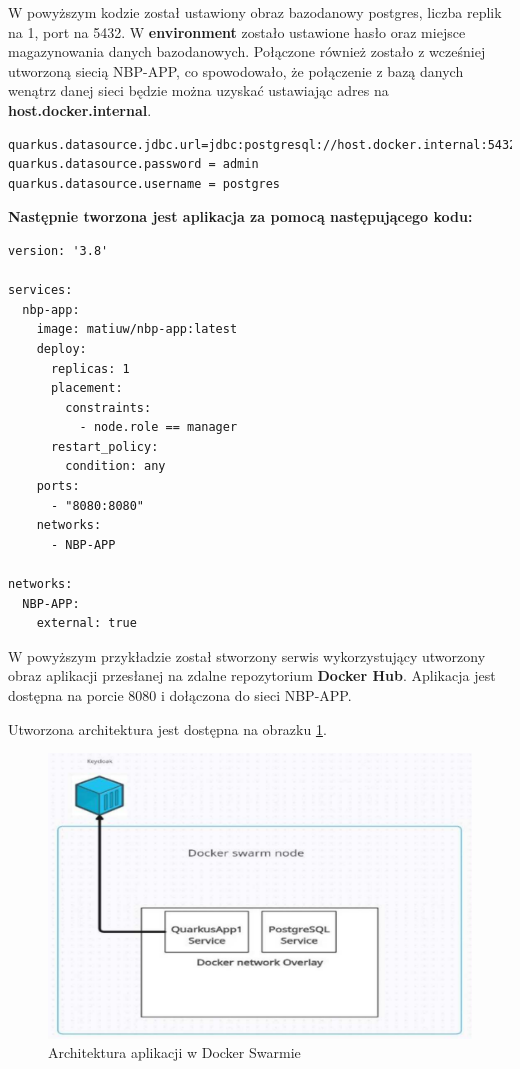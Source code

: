 \documentclass{iiuwb}
\begin{document}
W powyższym kodzie został ustawiony obraz bazodanowy postgres, 
liczba replik na 1, port na 5432. W \textbf{environment} zostało 
ustawione hasło oraz miejsce magazynowania danych bazodanowych. 
Połączone również zostało z wcześniej utworzoną siecią NBP-APP, 
co spowodowało, że połączenie z bazą danych wenątrz danej sieci
będzie można uzyskać ustawiając adres na \textbf{host.docker.internal}.

\begin{lstlisting}[breaklines=true]
quarkus.datasource.jdbc.url=jdbc:postgresql://host.docker.internal:5432/postgres
quarkus.datasource.password = admin
quarkus.datasource.username = postgres
\end{lstlisting}

\textbf{Następnie tworzona jest aplikacja za pomocą 
następującego kodu:}

\begin{lstlisting}[breaklines=true]
version: '3.8'

services:
  nbp-app:
    image: matiuw/nbp-app:latest
    deploy:
      replicas: 1
      placement:
        constraints:
          - node.role == manager
      restart_policy:
        condition: any
    ports:
      - "8080:8080"
    networks:
      - NBP-APP

networks:
  NBP-APP:
    external: true
\end{lstlisting}

W powyższym przykładzie został stworzony serwis 
wykorzystujący utworzony obraz aplikacji przesłanej
na zdalne repozytorium \textbf{Docker Hub}. Aplikacja jest
dostępna na porcie 8080 i dołączona do sieci NBP-APP.

Utworzona architektura jest dostępna na obrazku \ref{fig: Architektura aplikacji w Docker Swarmie}.

\begin{figure}[!h]
  \centering
  \includegraphics[width=12cm]{swarm/AplikacjaDockerSwarm.pdf}
  \caption{Architektura aplikacji w Docker Swarmie}
  \label{fig: Architektura aplikacji w Docker Swarmie}
\end{figure}
\end{document}
